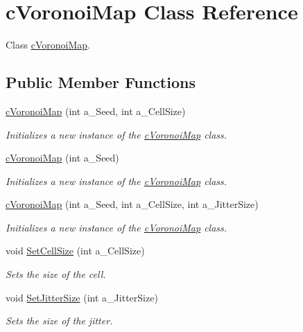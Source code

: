 \hypertarget{classc_voronoi_map}{}\section{c\+Voronoi\+Map Class Reference}
\label{classc_voronoi_map}


Class \hyperlink{classc_voronoi_map}{c\+Voronoi\+Map}.  


\subsection*{Public Member Functions}
\begin{DoxyCompactItemize}
\item 
\hyperlink{classc_voronoi_map_a9b450ab8f0bcc1fbb80a9c9583157faf}{c\+Voronoi\+Map} (int a\+\_\+\+Seed, int a\+\_\+\+Cell\+Size)
\begin{DoxyCompactList}\small\item\em Initializes a new instance of the \hyperlink{classc_voronoi_map}{c\+Voronoi\+Map} class. \end{DoxyCompactList}\item 
\hyperlink{classc_voronoi_map_a809169452b3942fcf3f2716b0a215c78}{c\+Voronoi\+Map} (int a\+\_\+\+Seed)
\begin{DoxyCompactList}\small\item\em Initializes a new instance of the \hyperlink{classc_voronoi_map}{c\+Voronoi\+Map} class. \end{DoxyCompactList}\item 
\hyperlink{classc_voronoi_map_a9be89da217e8252b90de1e11407ea467}{c\+Voronoi\+Map} (int a\+\_\+\+Seed, int a\+\_\+\+Cell\+Size, int a\+\_\+\+Jitter\+Size)
\begin{DoxyCompactList}\small\item\em Initializes a new instance of the \hyperlink{classc_voronoi_map}{c\+Voronoi\+Map} class. \end{DoxyCompactList}\item 
void \hyperlink{classc_voronoi_map_a8764d5ec75eb46d721d10f9d4369bfb9}{Set\+Cell\+Size} (int a\+\_\+\+Cell\+Size)
\begin{DoxyCompactList}\small\item\em Sets the size of the cell. \end{DoxyCompactList}\item 
void \hyperlink{classc_voronoi_map_ab9f95a3c7799d9010885145f19ce77b1}{Set\+Jitter\+Size} (int a\+\_\+\+Jitter\+Size)
\begin{DoxyCompactList}\small\item\em Sets the size of the jitter. \end{DoxyCompactList}\item 

\end{DoxyCompactItemize}

